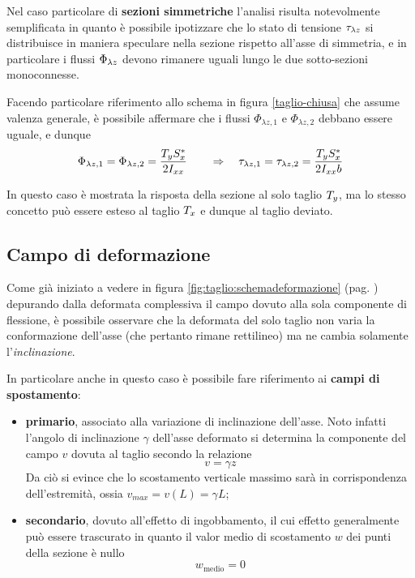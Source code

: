 		Nel caso particolare di \textbf{sezioni simmetriche} l'analisi risulta notevolmente semplificata in quanto è possibile ipotizzare che lo stato di tensione $\tau_{\lambda z}$ si distribuisce in maniera speculare nella sezione rispetto all'asse di simmetria, e in particolare i flussi $\Phi_{\lambda z}$ devono rimanere uguali lungo le due sotto-sezioni monoconnesse.
		
		
		Facendo particolare riferimento allo schema in figura \ref{taglio-chiusa} che assume valenza generale, è possibile affermare che i flussi $\Phi_{\lambda z,1}$ e $\Phi_{\lambda z,2}$ debbano essere uguale, e dunque
		\begin{equation}
			\Phi_{\lambda z,1} = \Phi_{\lambda z,2} = \frac{T_y S_x^*}{2I_{xx}} \qquad \Rightarrow \quad \tau_{\lambda z,1} = \tau_{\lambda z,2} = \frac{T_y S_x^*}{2I_{xx} b}
		\end{equation}
		\begin{nota}
			In questo caso è mostrata la risposta della sezione al solo taglio $T_y$, ma lo stesso concetto può essere esteso al taglio $T_x$ e dunque al taglio deviato.
		\end{nota}
	
	\subsection{Campo di deformazione}
		Come già iniziato a vedere in figura \ref{fig:taglio:schemadeformazione} (pag. \pageref{fig:taglio:schemadeformazione}) depurando dalla deformata complessiva il campo dovuto alla sola componente di flessione, è possibile osservare che la deformata del solo taglio non varia la conformazione dell'asse (che pertanto rimane rettilineo) ma ne cambia solamente l'\textit{inclinazione}.
		
		In particolare anche in questo caso è possibile fare riferimento ai \textbf{campi di spostamento}:
		\begin{itemize}
			\item \textbf{primario}, associato alla variazione di inclinazione dell'asse. Noto infatti l'angolo di inclinazione $\gamma$ dell'asse deformato si determina la componente del campo $v$ dovuta al taglio secondo la relazione
			\[ v = \gamma z\]
			Da ciò si evince che lo scostamento verticale massimo sarà in corrispondenza dell'estremità, ossia $v_{max} = v(L) = \gamma L$;
			\item \textbf{secondario}, dovuto all'effetto di ingobbamento, il cui effetto generalmente può essere trascurato in quanto il valor medio di scostamento $w$ dei punti della sezione è nullo
			\[ w_\textrm{medio}  = 0 \]
		\end{itemize}
		
